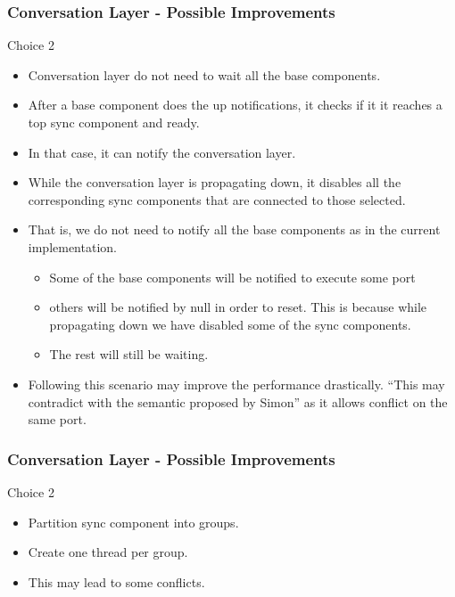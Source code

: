 \documentclass[compress,xcolor=dvipsnames,10pt]{beamer}
\begin{document}
\begin{frame}
\frametitle{Conversation Layer - Possible Improvements}
\begin{block}{Choice 2}
\begin{itemize}
\item Conversation layer do not need to wait all the base components. 
\item After a base component does the up notifications, it checks if it it reaches a top sync component and ready. 
\item In that case, it can notify the conversation layer. 
\item While the conversation layer is propagating down, it disables all the corresponding sync components that are connected to those selected. 
\item That is, we do not need to notify all the base components as in the current implementation. 
\begin{itemize}
\item Some of the base components will be notified to execute some port
\item others will be notified by null in order to reset. This is because while propagating down we have disabled some of the sync components. 
\item The rest will still be waiting.  
\end{itemize}
\item Following this scenario may improve the performance drastically. ``This may contradict with the semantic proposed by Simon'' as it allows conflict on the same port.
\end{itemize}
\end{block}
\end{frame}

\begin{frame}
\frametitle{Conversation Layer - Possible Improvements}
\begin{block}{Choice 2}
\begin{itemize}
\item Partition sync component into groups. 
\item Create one thread per group. 
\item This may lead to some conflicts. 
\end{itemize}
\end{block}
\end{frame}

\newcommand{\goesto}[1][]{\stackrel{#1}{\longrightarrow}} %
\newcommand{\ngoesto}[1][]{\stackrel{#1}{\not\longrightarrow}} %
\newcommand{\arrow}[2]  {\xrightarrow[{\scriptsize #2}]{{\scriptsize #1}}}
\end{document}
